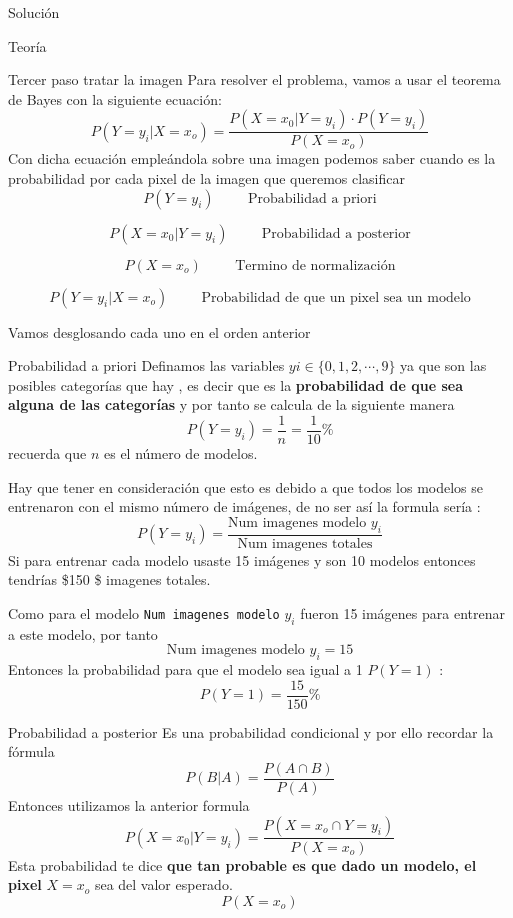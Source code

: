 \documentclass[
  spanish,
  ignorenonframetext,
]{beamer}
\begin{document}
\begin{frame}[fragile]{Solución}
\begin{block}{Teoría}
\begin{block}{Tercer paso tratar la imagen}
Para resolver el problema, vamos a usar el teorema de Bayes con la
siguiente ecuación: \[
P(Y=y_i|X=x_o)= \frac{P(X=x_0| Y=y_i)\cdot P(Y=y_i)}{P(X=x_o)}
\] Con dicha ecuación empleándola sobre una imagen podemos saber cuando
es la probabilidad por cada pixel de la imagen que queremos clasificar
\[
P(Y=y_i) \hspace{1cm} \text{Probabilidad a priori}
\]

\[
P(X=x_0| Y=y_i) \hspace{1cm} \text{Probabilidad a posterior}
\]

\[
P(X=x_o) \hspace{1cm} \text{Termino de normalización}
\]

\[
P(Y=y_i|X=x_o)  \hspace{1cm} \text{Probabilidad  de que un pixel sea un modelo}
\]

Vamos desglosando cada uno en el orden anterior

\begin{block}{Probabilidad a priori}
\protect\hypertarget{probabilidad-a-priori}{}
Definamos las variables \(yi \in \{0,1,2,\cdots,9\}\) ya que son las
posibles categorías que hay , es decir que es la \textbf{probabilidad de
que sea alguna de las categorías} y por tanto se calcula de la siguiente
manera \[
P(Y=y_i)=\frac{1}{n}=\frac{1}{10}\%
\] recuerda que \(n\) es el número de modelos.

Hay que tener en consideración que esto es debido a que todos los
modelos se entrenaron con el mismo número de imágenes, de no ser así la
formula sería : \[
P(Y=y_i)=\frac{\text{Num imagenes modelo }y_i}{\text{Num imagenes totales}}
\] Si para entrenar cada modelo usaste 15 imágenes y son 10 modelos
entonces tendrías \$150 \$ imagenes totales.

Como para el modelo \texttt{Num\ imagenes\ modelo} \(y_i\) fueron 15
imágenes para entrenar a este modelo, por tanto \[
\text{Num imagenes modelo }y_i=15
\] Entonces la probabilidad para que el modelo sea igual a 1 \(P(Y=1)\)
: \[
P(Y=1)=\frac{15}{150}\%
\]
\end{block}

\begin{block}{Probabilidad a posterior}
\protect\hypertarget{probabilidad-a-posterior}{}
Es una probabilidad condicional y por ello recordar la fórmula \[
P(B|A)=\frac{P(A\cap B)}{P(A)}
\] Entonces utilizamos la anterior formula \[
P(X=x_0| Y=y_i)=\frac{P(X=x_o\cap Y=y_i)}{P(X=x_o)}
\] Esta probabilidad te dice \textbf{que tan probable es que dado un
modelo, el pixel } \(X=x_o\) sea del valor esperado. \[
P(X=x_o)
\]


\end{block}
\end{block}
\end{block}
\end{frame}
\end{document}
